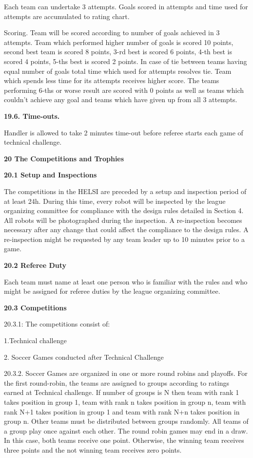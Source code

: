 \documentclass[a4paper]{article}
\begin{document}
Each team can undertake 3 attempts. Goals scored in attempts and time used for attempts are accumulated to rating chart.


Scoring. Team will be scored according to number of goals achieved in 3 attempts. Team which performed higher number of
goals is scored 10 points, second best team is scored 8 points, 3-rd best is scored 6 points, 4-th best is scored 4
points, 5-ths best is scored 2 points. In case of tie between teams having equal number of goals total time which used
for attempts resolves tie. Team which spends less time for its attempts receives higher score. The teams performing
6-ths or worse result are scored with 0 points as well as teams which couldn't achieve any goal and teams
which have given up from all 3 attempts.

\bigskip

\textbf{19.6. Time-outs. }

Handler is allowed to take 2 minutes time-out before referee starts each game of technical challenge.


\bigskip

\textbf{20 The Competitions and Trophies}

\textbf{20.1 Setup and Inspections}

The competitions in the HELSI are preceded by a setup and inspection period of at least 24h. During this time, every
robot will be inspected by the league organizing committee for compliance with the design rules detailed in Section 4.
All robots will be photographed during the inspection. A re-inspection becomes necessary after any change that could
affect the compliance to the design rules. A re-inspection might be requested by any team leader up to 10 minutes prior
to a game.

\bigskip

\textbf{20.2 Referee Duty}

Each team must name at least one person who is familiar with the rules and who might be assigned for referee duties by
the league organizing committee.

\bigskip

\textbf{20.3 Competitions}

20.3.1: The competitions consist of:

1.Technical challenge 

2. Soccer Games conducted after Technical Challenge

20.3.2. Soccer Games are organized in one or more round robins and playoffs. For the first round-robin, the teams are
assigned to groups according to ratings earned at Technical challenge. If number of groups is N then team with rank 1
takes position in group 1, team with rank n takes position in group n, team with rank N+1 takes position in group 1 and
team with rank N+n takes position in group n. Other teams must be distributed between groups randomly. All teams of a
group play once against each other. The round robin games may end in a draw. In this case, both teams receive one
point. Otherwise, the winning team receives three points and the not winning team receives zero points.
\end{document}
